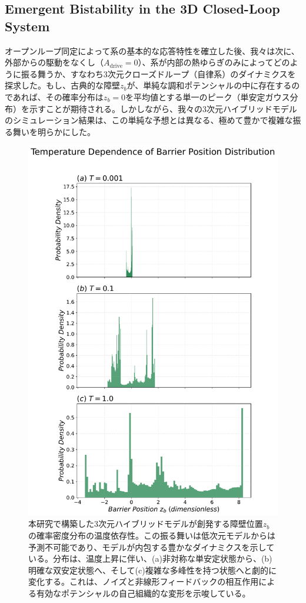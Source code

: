 \documentclass[a4paper,11pt,ja=standard,lualatex]{bxjsarticle}
\begin{document}
\subsection{Emergent Bistability in the 3D Closed-Loop System}
\label{subsec:bistability}
オープンループ同定によって系の基本的な応答特性を確立した後、我々は次に、外部からの駆動をなくし（$A_{\mathrm{drive}}=0$）、系が内部の熱ゆらぎのみによってどのように振る舞うか、すなわち3次元クローズドループ（自律系）のダイナミクスを探求した。もし、古典的な障壁$z_b$が、単純な調和ポテンシャルの中に存在するのであれば、その確率分布は$z_b=0$を平均値とする単一のピーク（単安定ガウス分布）を示すことが期待される。しかしながら、我々の3次元ハイブリッドモデルのシミュレーション結果は、この単純な予想とは異なる、極めて豊かで複雑な振る舞いを明らかにした。

\begin{figure}[htbp]
    \centering
    \includegraphics[width=0.6\linewidth]{Fig2_Bistability_Histograms.pdf}
    \caption{本研究で構築した3次元ハイブリッドモデルが\mbox{創発}する障壁位置$z_b$の確率密度分布の温度依存性。この振る舞いは低次元モデルからは予測不可能であり、モデルが内包する豊かなダイナミクスを示している。分布は、温度上昇に伴い、(a)非対称な単安定状態から、(b)明確な\mbox{双安定}状態へ、そして(c)複雑な多峰性を持つ状態へと劇的に変化する。これは、ノイズと非線形フィードバックの相互作用による有効なポテンシャルの自己組織的な変形を示唆している。
    \newline\newline
}
\end{figure}
\end{document}
